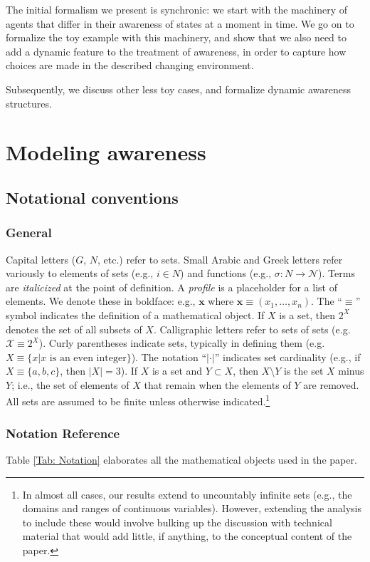 \documentclass[
11pt,
titlepage,
reqno,
]{article}%
\theoremstyle{definition}
\begin{document}
The initial formalism we present is synchronic: we start with the machinery of agents that differ in their awareness of states at a moment in time. We go on to formalize the toy example with this machinery, and show that we also need to add a dynamic feature to the treatment of awareness, in order to capture how choices are made in the described changing environment.

Subsequently, we discuss other less toy cases, and formalize dynamic awareness structures.

\section{Modeling awareness}
	\subsection{Notational conventions}
	\subsubsection{General}
	Capital letters ($G$, $N$, etc.) refer to sets.  
	Small Arabic and Greek letters refer variously to elements of sets (e.g., $i\in N$) and functions (e.g., $\sigma:N\rightarrow \mathcal{N}$). 
	Terms  are \textit{italicized} at the point of definition.  
	A \textit{profile} is a placeholder for a list of elements.
	We denote these in boldface: e.g., $\mathbf{x}$ where $\mathbf{x}\equiv(x_1,\ldots,x_n)$. 
	The ``$\equiv$'' symbol indicates the definition of a mathematical object. 
	If $X$ is a set, then $2^X$ denotes the set of all subsets of $X$. Calligraphic letters refer to sets of sets (e.g. $\mathcal{X}\equiv 2^X$). 
	Curly parentheses indicate sets, typically in defining them (e.g. $X\equiv\{x|x\text{ is an even integer}\}$). 
	The notation ``$|\cdot|$'' indicates set cardinality (e.g., if $X\equiv\{a,b,c\}$, then $|X|=3$). 
	If $X$ is a set and $Y\subset X$, then $X\setminus Y$ is the set $X$ minus $Y$; i.e., the set of elements of $X$ that  remain when the elements of $Y$ are removed. 
	All sets are assumed to be finite unless otherwise indicated.\footnote
	{
		In almost all cases, our results extend to uncountably infinite sets (e.g., the domains and ranges of continuous variables). However, extending the analysis to include these would involve bulking up the discussion with technical material that would add little, if anything, to the conceptual content of the paper.
	}


\pagebreak
\subsubsection{Notation Reference}
Table \ref{Tab: Notation} elaborates all the mathematical objects used in the paper.
\end{document}

